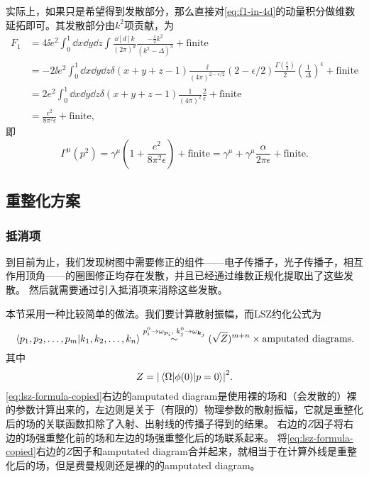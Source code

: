 实际上，如果只是希望得到发散部分，那么直接对\eqref{eq:f1-in-4d}的动量积分做维数延拓即可。其发散部分由$k^2$项贡献，为
\[
    \begin{aligned}
        F_1 &= 4 \ii e^2 \int_0^1 \dd{x} \dd{y} \dd{z} \int \frac{\dd[d]{k}}{(2\pi)^d} \frac{-\frac{1}{2} k^2}{(k^2 - \Delta)^3} + \text{finite} \\
        &= - 2 \ii e^2 \int_0^1 \dd{x} \dd{y} \dd{z} \delta(x + y + z - 1) \frac{\ii}{(4\pi)^{2 - \epsilon / 2}} (2 - \epsilon / 2) \frac{\Gamma\left(\frac{\epsilon}{2}\right)}{2} \left(\frac{1}{\Delta}\right)^{\epsilon} + \text{finite} \\
        &= 2 e^2 \int_0^1 \dd{x} \dd{y} \dd{z} \delta(x + y + z - 1) \frac{1}{(4\pi)^2} \frac{2}{\epsilon} + \text{finite} \\
        &= \frac{e^2}{8\pi^2 \epsilon} + \text{finite}, 
    \end{aligned}
\]
即
\begin{equation}
    \Gamma^\mu(p^2) = \gamma^\mu \left( 1 + \frac{e^2}{8\pi^2 \epsilon} \right) + \text{finite} = \gamma^\mu + \gamma^\mu \frac{\alpha}{2\pi \epsilon} + \text{finite}.
    \label{eq:vertex-one-loop-divergence}
\end{equation}

\subsection{重整化方案}

\subsubsection{抵消项}

到目前为止，我们发现树图中需要修正的组件——电子传播子，光子传播子，相互作用顶角——的圈图修正均存在发散，并且已经通过维数正规化提取出了这些发散。
然后就需要通过引入抵消项来消除这些发散。

本节采用一种比较简单的做法。我们要计算散射振幅，而LSZ约化公式为
\begin{equation}
    \braket*{p_1, p_2, \ldots, p_m}{k_1, k_2, \ldots, k_n} \stackrel{p_i^0 \to \omega_{\vb*{p}_i}, \; k_j^0 \to \omega_{\vb*{k}_j}}{\sim} (\sqrt{Z})^{m+n} \times \text{amputated diagrams}.
    \label{eq:lsz-formula-copied}
\end{equation}
其中
\begin{equation}
    Z = \abs{\mel*{\Omega}{\phi(0)}{p=0}}^2.
\end{equation}
\eqref{eq:lsz-formula-copied}右边的amputated diagram是使用裸的场和（会发散的）裸的参数计算出来的，左边则是关于（有限的）物理参数的散射振幅，它就是重整化后的场的关联函数扣除了入射、出射线的传播子得到的结果。
右边的$Z$因子将右边的场强重整化前的场和左边的场强重整化后的场联系起来。
将\eqref{eq:lsz-formula-copied}右边的$Z$因子和amputated diagram合并起来，就相当于在计算外线是重整化后的场，但是费曼规则还是裸的的amputated diagram。

